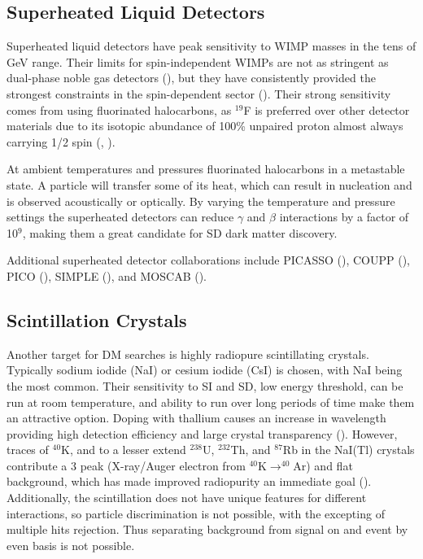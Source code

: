  
\subsection{Superheated Liquid Detectors} \label{subsubsec:bubbles}
Superheated liquid detectors have peak sensitivity to WIMP masses in the tens of GeV range.  Their limits for spin-independent
WIMPs are not as stringent as dual-phase noble gas detectors (), but they have consistently provided the
strongest constraints in the spin-dependent sector ().  Their strong sensitivity comes from using fluorinated
halocarbons, as $^{19}$F is preferred over other detector materials due to its isotopic abundance of 100\% unpaired proton
almost always carrying 1/2 spin (, ).

At ambient temperatures and pressures fluorinated halocarbons in a metastable state.  A particle will transfer some of its heat,
which can result in nucleation and is observed acoustically or optically.  By varying the temperature and pressure settings
the superheated detectors can reduce $\gamma$ and $\beta$ interactions by a factor of 10$^{9}$, making them a great candidate for
SD dark matter discovery.

Additional superheated detector collaborations include PICASSO (), COUPP (),
PICO (), SIMPLE (), and MOSCAB ().



\subsection{Scintillation Crystals} \label{subsec:crystals}
Another target for DM searches is highly radiopure scintillating crystals.  Typically sodium iodide (NaI) or cesium iodide (CsI) is chosen,
with NaI being the most common.  Their sensitivity to SI and SD, low energy threshold, can be run at room temperature,
and ability to run over long periods of time
make them an attractive option.  Doping with thallium causes an increase in wavelength providing high detection efficiency and large
crystal transparency ().  However, traces of $^{40}$K, and to a lesser extend $^{238}$U, $^{232}$Th,
and $^{87}$Rb in the NaI(Tl) crystals contribute a 3 \kevee peak (X-ray/Auger electron from $^{40}\mathrm{K} \rightarrow ^{40}\mathrm{Ar}$)
and flat background, which has made improved radiopurity an immediate goal ().  Additionally, the scintillation
does not have unique features for different interactions, so particle discrimination is not possible, with the excepting of
multiple hits rejection.  Thus separating background from signal on and event by even basis is not possible.

